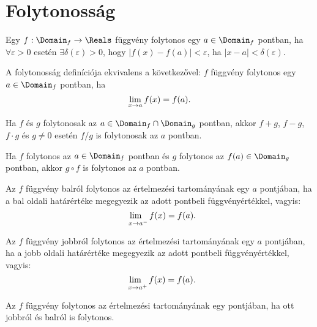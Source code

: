 \section{Folytonosság}

\begin{definition}[Folytonosság]
  Egy $f : \Domain_f \rightarrow \Reals$ függvény folytonos egy $a \in
    \Domain_f$ pontban, ha $\forall \varepsilon > 0$ esetén $\exists \delta(
    \varepsilon) > 0$, hogy $|f(x) - f(a)| < \varepsilon$, ha $|x - a| < \delta(
    \varepsilon)$.
\end{definition}

\begin{statement}
  A folytonosság definíciója ekvivalens a következővel: $f$ függvény folytonos
  egy ${a \in \Domain_f}$ pontban, ha
  \[
    \lim_{x \to a} f(x) = f(a)
    \text.
  \]
\end{statement}

\begin{note}
  Ha $f$ és $g$ folytonosak az $a \in \Domain_f \cap \Domain_g$ pontban, akkor
  $f + g$, $f - g$, $f \cdot g$ és $g \neq 0$ esetén $f / g$ is folytonosak az
  $a$ pontban.
\end{note}

\begin{note}
  Ha $f$ folytonos az $a \in \Domain_f$ pontban és $g$ folytonos az $f(a) \in
    \Domain_g$ pontban, akkor $g \circ f$ is folytonos az $a$ pontban.
\end{note}

\begin{definition}
  Az $f$ függvény balról folytonos az értelmezési tartományának egy $a$
  pontjában, ha a bal oldali határértéke megegyezik az adott pontbeli
  függvényértékkel, vagyis:
  \[
    \lim_{\phantom{{}^{-}} x \rightarrow a^-} f(x) = f(a)
    \text.
  \]
\end{definition}

\begin{definition}
  Az $f$ függvény jobbról folytonos az értelmezési tartományának egy $a$
  pontjában, ha a jobb oldali határértéke megegyezik az adott pontbeli
  függvényértékkel, vagyis:
  \[
    \lim_{\phantom{{}^{+}} x \rightarrow a^+} f(x) = f(a)
    \text.
  \]
\end{definition}

\begin{note}
  Az $f$ függvény folytonos az értelmezési tartományának egy pontjában, ha ott
  jobbról és balról is folytonos.
\end{note}

